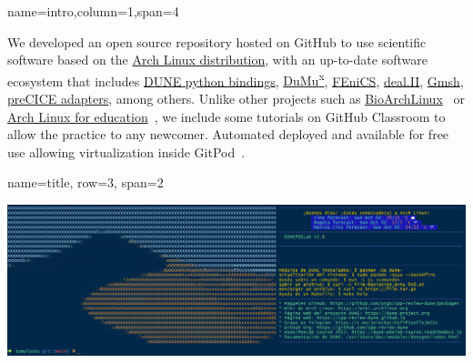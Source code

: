 \documentclass[
	paper=a0,%
	style=ruled, %
	]{bfhsciposter}
\newcommand{\tbs}{\textbackslash}
\let\code\texttt
\newcommand*{\macro}[1]{\code{\tbs#1}}
\let\pck\textsf
\let\cls\textsf
\begin{document}
\begin{tcbposter}[
		poster={
				columns=4,
				rows=7,
				spacing=1cm,
			},]

	\begin{posterboxenv}[,BFH-abstract,title=Abstract]{name=intro,column=1,span=4} %

		We developed an open source repository hosted on GitHub to use
		scientific software based on the \href{https://archlinux.org}{Arch Linux distribution},
		with an up-to-date software ecosystem that includes
		\href{https://dune-project.org/doc/gettingstarted}{DUNE python bindings},
		\href{https://dumux.org}{DuMu\textsuperscript{x}},
		\href{https://fenicsproject.org}{FEniCS},
		\href{https://www.dealii.org}{deal.II},
		\href{https://gmsh.info}{Gmsh},
		\href{https://precice.org/adapters-overview.html}{preCICE adapters},
		among others.
		Unlike other projects such as
		\href{https://github.com/BioArchLinux}{BioArchLinux}~\cite{bioarchlinux_2022}
		or \href{https://github.com/arch4edu}{Arch Linux for education}~\cite{arch4edu2019},
		we include some tutorials on GitHub Classroom to allow the practice
		to any newcomer.
		Automated deployed and available for free use allowing virtualization inside
		GitPod~\cite{gitpod_2022}.
	\end{posterboxenv}

	\begin{posterboxenv}[title=Introduction]{name=title, row=3, span=2}


		\includegraphics[width=\linewidth]{splash}


\end{posterboxenv}
\end{tcbposter}
\end{document}
